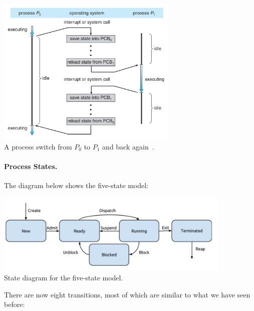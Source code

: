 \begin{center}
	\includegraphics[width=0.65\textwidth]{images/process-switch.png}\\
	A process switch from $P_{0}$ to $P_{1}$ and back again~\cite{osc}.
\end{center}

\paragraph{Process States.}

The diagram below shows the five-state model:

\begin{center}
	\includegraphics[width=0.85\textwidth]{images/5-state-model.png}\\
	State diagram for the five-state model.
\end{center}

There are now eight transitions, most of which are similar to what we have seen before:

